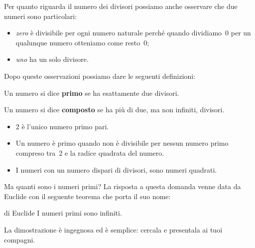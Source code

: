 Per quanto riguarda il numero dei divisori possiamo anche osservare che 
due numeri sono particolari:

\begin{itemize} [nosep]
\item \emph{zero} è divisibile per ogni numero naturale perché quando 
dividiamo~0 per un qualunque numero otteniamo come resto~0;
\item \emph{uno} ha un solo divisore.
\end{itemize}

Dopo queste osservazioni possiamo dare le seguenti definizioni:

\begin{definizione}{}{}
Un numero si dice \textbf{primo} se ha esattamente due divisori. 
\end{definizione}

\begin{definizione}{}{}
Un numero si dice \textbf{composto} se ha più di due, ma non infiniti, 
divisori. 
\end{definizione}


\begin{osservazioni}{}{}
\begin{itemize} [nosep]
\item 2 è l'unico numero primo pari.
\item Un numero è primo quando non è divisibile per nessun numero 
primo compreso tra~2 e la radice quadrata del numero.
\item I numeri con un numero dispari di divisori, sono numeri quadrati.
\end{itemize}
\end{osservazioni}


\vspace{1em}
Ma quanti sono i numeri primi? La risposta a questa domanda venne data da 
Euclide con il seguente teorema che porta il suo nome:

\begin{teorema}{di Euclide}{}
I numeri primi sono infiniti.
\end{teorema}

La dimostrazione è ingegnosa ed è semplice: cercala e presentala ai tuoi 
compagni.

